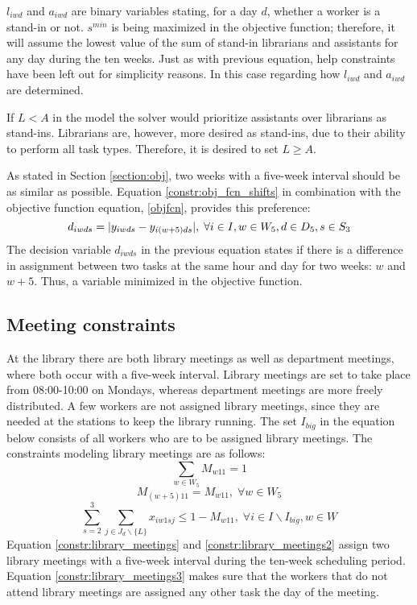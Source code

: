 $l_{iwd}$ and $a_{iwd}$ are binary variables stating, for a day $d$, whether a worker is a stand-in or not. $s^{min}$ is being maximized in the objective function; therefore, it will assume the lowest value of the sum of stand-in librarians and assistants for any day during the ten weeks. Just as with previous equation, help constraints have been left out for simplicity reasons. In this case regarding how $l_{iwd}$ and $a_{iwd}$ are determined.

If $L < A$ in the model the solver would prioritize assistants over librarians as stand-ins. Librarians are, however, more desired as stand-ins, due to their ability to perform all task types. Therefore, it is desired to set $L \geq A$.

As stated in Section \ref{section:obj}, two weeks with a five-week interval should be as similar as possible. Equation \ref{constr:obj_fcn_shifts} in combination with the objective function equation, \ref{objfcn}, provides this preference:
\begin{equation} \label{constr:obj_fcn_shifts}
d_{iwds} = \lvert y_{iwds} - y_{i(w+5)ds}\rvert, \; \forall i \in I, w \in W_5, d \in D_5, s \in S_3
\end{equation}
The decision variable $d_{iwds}$ in the previous equation states if there is a difference in assignment between two tasks at the same hour and day for two weeks: $w$ and $w+5$. Thus, a variable minimized in the objective function.
\subsection{Meeting constraints} \label{section:meeting_constraints}
At the library there are both library meetings as well as department meetings, where both occur with a five-week interval. Library meetings are set to take place from 08:00-10:00 on Mondays, whereas department meetings are more freely distributed. A few workers are not assigned library meetings, since they are needed at the stations to keep the library running. The set $I_{big}$ in the equation below consists of all workers who are to be assigned library meetings. The constraints modeling library meetings are as follows:
\begin{equation} \label{constr:library_meetings}
\sum_{w \in W_5} M_{w11} = 1
\end{equation}
\begin{equation} \label{constr:library_meetings2}
M_{(w+5)11} = M_{w11}, \; \forall w \in W_5
\end{equation}
\begin{equation} \label{constr:library_meetings3}
\sum_{s=2}^{3} \sum_{j \in J_d \backslash \{L\}} x_{iw1sj} \leq 1-M_{w11}, \; \forall i \in I \backslash I_{big}, w \in W
\end{equation}
Equation \ref{constr:library_meetings} and \ref{constr:library_meetings2} assign two library meetings with a five-week interval during the ten-week scheduling period. Equation \ref{constr:library_meetings3} makes sure that the workers that do not attend library meetings are assigned any other task the day of the meeting.

